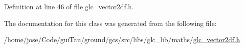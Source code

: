 Definition at line 46 of file glc\-\_\-vector2df.\-h.



The documentation for this class was generated from the following file\-:\begin{DoxyCompactItemize}
\item 
/home/jose/\-Code/gui\-Tau/ground/gcs/src/libs/glc\-\_\-lib/maths/\hyperlink{glc__vector2df_8h}{glc\-\_\-vector2df.\-h}\end{DoxyCompactItemize}
